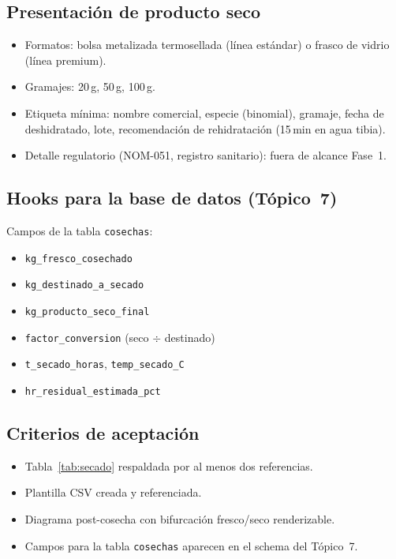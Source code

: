 \subsection{Presentación de producto seco}
\label{sec:postcosecha:presentacion}

\begin{itemize}[leftmargin=*,itemsep=0pt]
  \item Formatos: bolsa metalizada termosellada (línea estándar) o
        frasco de vidrio (línea premium).
  \item Gramajes: 20\,g, 50\,g, 100\,g.
  \item Etiqueta mínima: nombre comercial, especie (binomial),
        gramaje, fecha de deshidratado, lote, recomendación de
        rehidratación (15\,min en agua tibia).
  \item Detalle regulatorio (NOM-051, registro sanitario): fuera de
        alcance Fase~1.
\end{itemize}

\subsection{Hooks para la base de datos (Tópico~7)}
\label{sec:postcosecha:hooks}

Campos de la tabla \texttt{cosechas}:

\begin{itemize}[leftmargin=*,itemsep=0pt]
  \item \texttt{kg\_fresco\_cosechado}
  \item \texttt{kg\_destinado\_a\_secado}
  \item \texttt{kg\_producto\_seco\_final}
  \item \texttt{factor\_conversion} (seco $\div$ destinado)
  \item \texttt{t\_secado\_horas}, \texttt{temp\_secado\_C}
  \item \texttt{hr\_residual\_estimada\_pct}
\end{itemize}

\subsection{Criterios de aceptación}
\label{sec:postcosecha:aceptacion}

\begin{itemize}[leftmargin=*,itemsep=0pt]
  \item Tabla~\ref{tab:secado} respaldada por al menos dos
        referencias.
  \item Plantilla CSV creada y referenciada.
  \item Diagrama post-cosecha con bifurcación fresco/seco
        renderizable.
  \item Campos para la tabla \texttt{cosechas} aparecen en el schema
        del Tópico~7.
\end{itemize}
